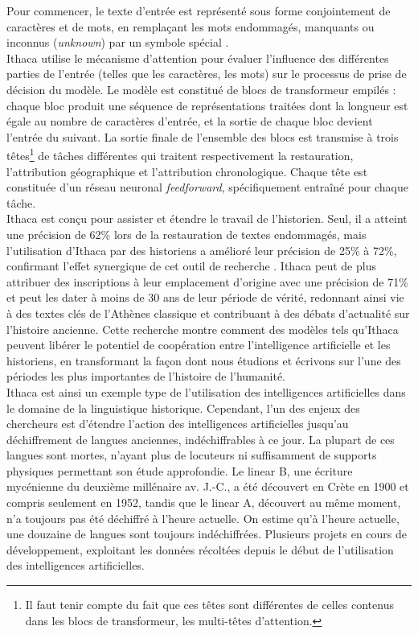 \documentclass[12pt, twoside]{report}
\begin{document}
Pour commencer, le texte d'entrée est représenté sous forme conjointement de caractères et de mots, en remplaçant les mots endommagés, manquants ou inconnus (\textit{unknown}) par un symbole spécial \og [unk]\fg.\\
Ithaca utilise le mécanisme d'attention pour évaluer l'influence des différentes parties de l'entrée \cite{deepmind2022} (telles que les caractères, les mots) sur le processus de prise de décision du modèle. 
Le modèle est constitué de blocs de transformeur empilés : chaque bloc produit une séquence de représentations traitées dont la longueur est égale au nombre de caractères d'entrée, et la sortie de chaque bloc devient l'entrée du suivant. La sortie finale de l'ensemble des blocs est transmise à trois têtes\footnote{Il faut tenir compte du fait que ces têtes sont différentes de celles contenus dans les blocs de transformeur, les multi-têtes d'attention.} de tâches différentes qui traitent respectivement la restauration, l'attribution géographique et l'attribution chronologique. Chaque tête est constituée d'un réseau neuronal \textit{feedforward}, spécifiquement entraîné pour chaque tâche.\\

Ithaca est conçu pour assister et étendre le travail de l'historien. Seul, il a atteint une précision de 62\% lors de la restauration de textes endommagés, mais l'utilisation d'Ithaca par des historiens a amélioré leur précision de 25\% à 72\%, confirmant l'effet synergique de cet outil de recherche \cite{deepmind2022}. Ithaca peut de plus attribuer des inscriptions à leur emplacement d'origine avec une précision de 71\% et peut les dater à moins de 30 ans de leur période de vérité, redonnant ainsi vie à des textes clés de l'Athènes classique et contribuant à des débats d'actualité sur l'histoire ancienne. Cette recherche montre comment des modèles tels qu'Ithaca peuvent libérer le potentiel de coopération entre l'intelligence artificielle et les historiens, en transformant la façon dont nous étudions et écrivons sur l'une des périodes les plus importantes de l'histoire de l'humanité.\\

Ithaca est ainsi un exemple type de l'utilisation des intelligences artificielles dans le domaine de la linguistique historique. Cependant, l'un des enjeux des chercheurs est d'étendre l'action des intelligences artificielles jusqu'au déchiffrement de langues anciennes, indéchiffrables à ce jour. La plupart de ces langues sont mortes, n'ayant plus de locuteurs ni suffisamment de supports physiques permettant son étude approfondie. Le linear B, une écriture mycénienne du deuxième millénaire av. J.-C., a été découvert en Crète en 1900 et compris seulement en 1952, tandis que le linear A, découvert au même moment, n'a toujours pas été déchiffré à l'heure actuelle. On estime qu'à l'heure actuelle, une douzaine de langues sont toujours indéchiffrées. Plusieurs projets en cours de développement, exploitant les données récoltées depuis le début de l'utilisation des intelligences artificielles.
\end{document}
